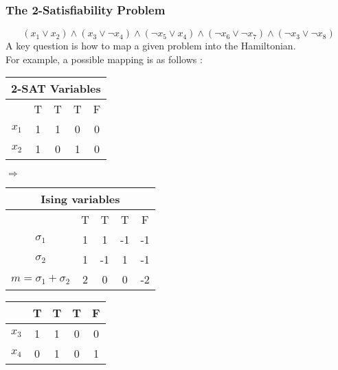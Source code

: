 \documentclass{beamer}
\begin{document}
\begin{frame}
	\frametitle{The 2-Satisfiability Problem}
	\begin{equation*}
	(x_1\lor x_2)\land (x_3\lor \neg x_4)\land(\neg x_5 \lor x_4)\land(\neg x_6 \lor \neg x_7)\land(\neg x_3 \lor \neg x_8)%
	\end{equation*}
	A key question is how to map a given problem into the Hamiltonian. \\
	For example, a possible mapping is as follows :
	\begin{table}[h!]
		
		
		
		\begin{center}
			\begin{tabular}{|c|c|c|c|c|}
				
				\multicolumn{5}{c}{2-SAT Variables}\\
				\hline
				& T & T & T & F \\
				\hline
				\hline
				$x_1$ & 1 & 1 & 0 & 0 \\
				\hline
				$x_2$ & 1 & 0 & 1 & 0 \\
				\hline
			\end{tabular}
			\quad
			$\Rightarrow$
			\quad
			\begin{tabular}{|c|c|c|c|c|}
				\multicolumn{5}{c}{Ising variables}\\
				\hline
				& T & T & T & F \\
				\hline
				\hline
				$\sigma_1$ & 1 & 1 & -1 & -1 \\
				\hline
				$\sigma_2$ & 1 & -1 & 1 & -1 \\
				\hline
				$m=\sigma_1+\sigma_2$ & 2 & 0 & 0 & -2 \\
				\hline
			\end{tabular}
		\end{center}
		
		\begin{center}
			\begin{tabular}{|c|c|c|c|c|}
				
				\hline
				& T & T & T & F \\
				\hline
				\hline
				$x_3$ & 1 & 1 & 0 & 0 \\
				\hline
				$x_4$ & 0 & 1 & 0 & 1 \\
				\hline
				

\end{tabular}
\end{center}
\end{table}
\end{frame}
\end{document}
